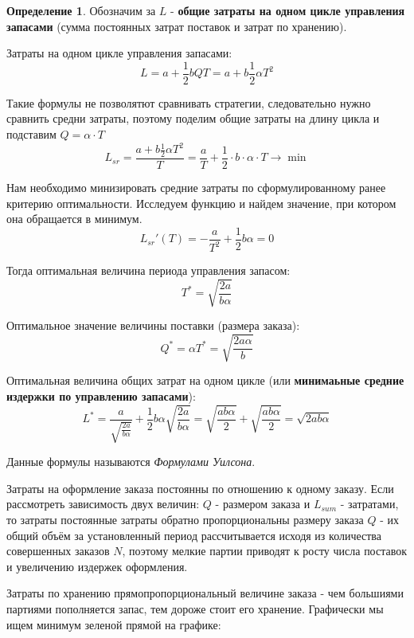\documentclass[aps,%
12pt,%
final,%
oneside,
onecolumn,%
musixtex, %
superscriptaddress,%
centertags]{article} %
\theoremstyle{plain}
\theoremstyle{definition}
\newtheorem{definition}{Определение}[subsection]
\theoremstyle{remark}
\begin{document}
\begin{definition}
	Обозначим за $L$ - \textbf{общие затраты на одном цикле управления запасами} (сумма постоянных затрат поставок и затрат по хранению).
\end{definition}

Затраты на одном цикле управления запасами:
$$L = a+\frac{1}{2}bQT = a+b\frac{1}{2}\alpha T^2$$

Такие формулы не позволятют сравнивать стратегии, следовательно нужно сравнить средни затраты, поэтому поделим общие затраты на длину цикла и подставим $Q = \alpha \cdot T$
$$ L_{sr} = \frac{a+b\frac{1}{2}\alpha T^2}{T} = \frac{a}{T} + \frac{1}{2} \cdot b \cdot \alpha\cdot  T \to \min$$

Нам необходимо минизировать средние затраты по сформулированному ранее критерию оптимальности. Исследуем функцию и найдем значение, при котором она обращается в минимум.
$$L_{sr}'(T) = -\frac{a}{T^2} + \frac{1}{2}b\alpha = 0$$

Тогда оптимальная величина периода управления запасом:
$$T^* = \sqrt{\frac{2a}{b\alpha}}$$

Оптимальное значение величины поставки (размера заказа):
$$Q^* = \alpha T^* = \sqrt {\frac{2a\alpha}{b}}$$

Оптимальная величина  общих затрат на одном цикле (или \textbf{минимаьные средние издержки по управлению запасами}):
$$L^* = \frac{a}{\sqrt{\frac{2a}{b\alpha}}} + \frac{1}{2}b\alpha \sqrt{\frac{2a}{b\alpha}} = 
\sqrt{\frac{ab\alpha}{2}} + \sqrt{\frac{ab\alpha}{2}} = \sqrt{2ab\alpha}$$

Данные формулы называются \textit{Формулами Уилсона}.

Затраты на оформление заказа постоянны по отношению к одному заказу. 
Если рассмотреть зависимость двух величин: $Q$ - размером заказа и $L_{sum}$ - затратами, то затраты постоянные затраты обратно пропорциональны размеру заказа $Q$ - их общий объём за установленный период рассчитывается исходя из количества совершенных заказов $N$, поэтому мелкие партии приводят к росту числа поставок и увеличению издержек оформления. 

Затраты по хранению прямопропорциональный величине заказа - чем большиями партиями пополняется запас, тем дороже стоит его хранение. Графически мы ищем минимум зеленой прямой на графике:
\begin{center}
\end{center}
\end{document}
